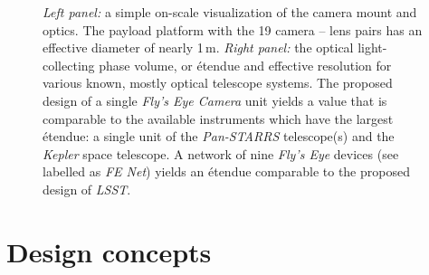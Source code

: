 \begin{figure}
\begin{center}
%
\end{center}
\caption{%
{\it Left panel:} a simple on-scale visualization of the camera 
mount and optics. The payload platform with the 19 camera -- lens pairs has
an effective diameter of nearly 1\,m. 
{\it Right panel:} the optical light-collecting phase volume, 
or \'etendue and effective resolution for various known,
mostly optical telescope systems. 
The proposed design of a single {\it Fly's Eye Camera} unit yields a value that 
is comparable to the available 
instruments which have the largest \'etendue: a single unit
of the \emph{Pan-STARRS} telescope(s) and 
the \emph{Kepler} space telescope. A network of nine {\it Fly's Eye} devices
(see labelled as {\it FE Net}) yields an \'etendue comparable to 
the proposed design of \emph{LSST}.}
\label{fig:flyseye}
\end{figure}

\section{Design concepts}

